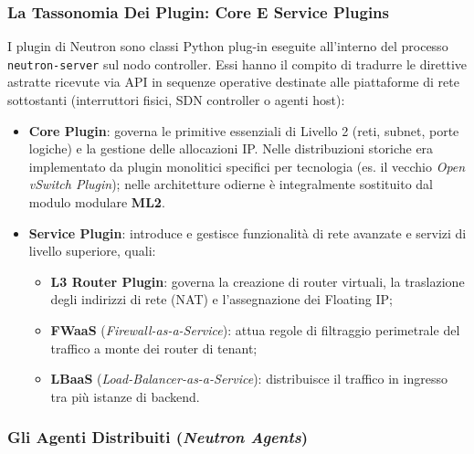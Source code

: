 \documentclass[11pt, a4paper]{article}
\begin{document}
\subsubsection{La Tassonomia Dei Plugin: Core E Service Plugins}

I plugin di Neutron sono classi Python plug-in eseguite all'interno del processo \texttt{neutron-server} sul nodo controller. Essi hanno il compito di tradurre le direttive astratte ricevute via API in sequenze operative destinate alle piattaforme di rete sottostanti (interruttori fisici, SDN controller o agenti host):
\begin{itemize}[leftmargin=*]
    \item \textbf{Core Plugin}: governa le primitive essenziali di Livello 2 (reti, subnet, porte logiche) e la gestione delle allocazioni IP. Nelle distribuzioni storiche era implementato da plugin monolitici specifici per tecnologia (es. il vecchio \emph{Open vSwitch Plugin}); nelle architetture odierne è integralmente sostituito dal modulo modulare \textbf{ML2}.
    \item \textbf{Service Plugin}: introduce e gestisce funzionalità di rete avanzate e servizi di livello superiore, quali:
    \begin{itemize}
        \item \textbf{L3 Router Plugin}: governa la creazione di router virtuali, la traslazione degli indirizzi di rete (NAT) e l'assegnazione dei Floating IP;
        \item \textbf{FWaaS} (\emph{Firewall-as-a-Service}): attua regole di filtraggio perimetrale del traffico a monte dei router di tenant;
        \item \textbf{LBaaS} (\emph{Load-Balancer-as-a-Service}): distribuisce il traffico in ingresso tra più istanze di backend.
    \end{itemize}
\end{itemize}

\subsubsection{Gli Agenti Distribuiti (\emph{Neutron Agents})}
\end{document}
